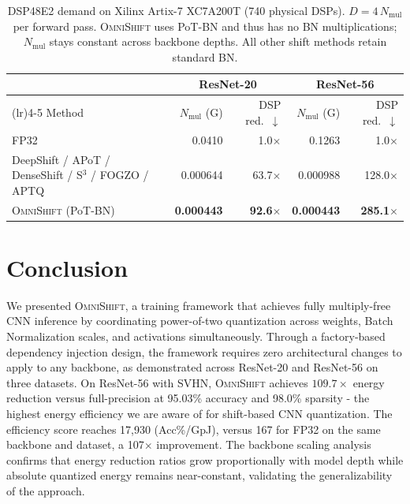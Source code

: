 \documentclass[12pt]{article}
\newcommand{\omnishift}{\textsc{OmniShift}}
\begin{document}
\begin{table}[H]
\centering
\small
\caption{DSP48E2 demand on Xilinx Artix-7 XC7A200T (740 physical DSPs). $D = 4\,N_\text{mul}$ per forward pass. \omnishift{} uses PoT-BN and thus has no BN multiplications; $N_\text{mul}$ stays constant across backbone depths. All other shift methods retain standard BN.}
\label{tab:dsp}
\setlength{\tabcolsep}{5pt}
\begin{tabular}{@{} >{\raggedright\arraybackslash}p{5.6cm} rr rr @{}}
\toprule
& \multicolumn{2}{c}{ResNet-20} & \multicolumn{2}{c}{ResNet-56} \\
\cmidrule(lr){2-3}\cmidrule(lr){4-5}
Method & $N_\text{mul}$ (G) & DSP red.\ $\downarrow$ & $N_\text{mul}$ (G) & DSP red.\ $\downarrow$ \\
\midrule
FP32                     & 0.0410  & 1.0$\times$   & 0.1263  & 1.0$\times$ \\
DeepShift / APoT / DenseShift / S$^3$ / FOGZO / APTQ & 0.000644 & 63.7$\times$ & 0.000988 & 128.0$\times$ \\
\omnishift{} (PoT-BN)   & \textbf{0.000443} & \textbf{92.6$\times$}  & \textbf{0.000443} & \textbf{285.1$\times$} \\
\bottomrule
\end{tabular}
\end{table}

\section{Conclusion}
\label{sec:conclusion}

We presented \omnishift{}, a training framework that achieves fully multiply-free CNN inference by coordinating power-of-two quantization across weights, Batch Normalization scales, and activations simultaneously. Through a factory-based dependency injection design, the framework requires zero architectural changes to apply to any backbone, as demonstrated across ResNet-20 and ResNet-56 on three datasets. On ResNet-56 with SVHN, \omnishift{} achieves $\mathbf{109.7\times}$ energy reduction versus full-precision at 95.03\% accuracy and 98.0\% sparsity - the highest energy efficiency we are aware of for shift-based CNN quantization. The efficiency score reaches 17,930 (Acc\%/GpJ), versus 167 for FP32 on the same backbone and dataset, a 107$\times$ improvement. The backbone scaling analysis confirms that energy reduction ratios grow proportionally with model depth while absolute quantized energy remains near-constant, validating the generalizability of the approach.
\end{document}
